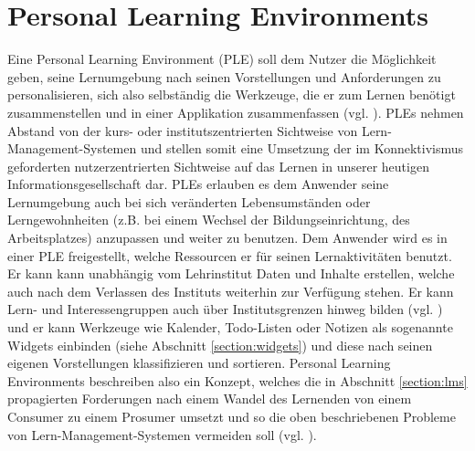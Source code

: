 \section{Personal Learning Environments}\label{section:ple_intro}
Eine Personal Learning Environment (PLE) soll dem Nutzer die Möglichkeit geben, seine Lernumgebung nach seinen Vorstellungen und Anforderungen zu personalisieren, sich also selbständig die Werkzeuge, die er zum Lernen benötigt zusammenstellen und in einer Applikation zusammenfassen (vgl. \cite{VanHarmelen}). PLEs nehmen Abstand von der kurs- oder institutszentrierten Sichtweise von Lern-Management-Systemen und stellen somit eine Umsetzung der im Konnektivismus geforderten nutzerzentrierten Sichtweise auf das Lernen in unserer heutigen Informationsgesellschaft dar. PLEs erlauben es dem Anwender seine Lernumgebung auch bei sich veränderten Lebensumständen oder Lerngewohnheiten (z.B. bei einem Wechsel der Bildungseinrichtung, des Arbeitsplatzes) anzupassen und weiter zu benutzen. Dem Anwender wird es in einer PLE freigestellt, welche Ressourcen er für seinen Lernaktivitäten benutzt. Er kann kann unabhängig vom Lehrinstitut Daten und Inhalte erstellen, welche auch nach dem Verlassen des Instituts weiterhin zur Verfügung stehen. Er kann Lern- und Interessengruppen auch über Institutsgrenzen hinweg bilden (vgl. \cite{Schaffert2008a}) und er kann Werkzeuge wie Kalender, Todo-Listen oder Notizen als sogenannte Widgets einbinden (siehe Abschnitt \ref{section:widgets}) und diese nach seinen eigenen Vorstellungen klassifizieren und sortieren. Personal Learning Environments beschreiben also ein Konzept, welches die in Abschnitt \ref{section:lms} propagierten Forderungen nach einem Wandel des Lernenden von einem Consumer zu einem Prosumer umsetzt und so die oben beschriebenen Probleme von Lern-Management-Systemen vermeiden soll (vgl. \cite{Attwell2007}).

